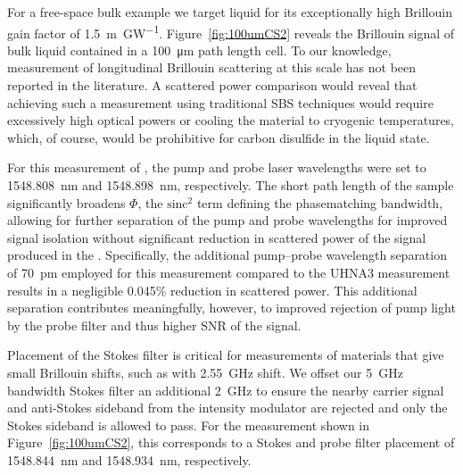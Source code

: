 For a free-space bulk example we target liquid  for its exceptionally high Brillouin gain factor of \SI{1.5}{\meter\per\giga\watt}.\cite{boyd2020nonlinear} Figure~\ref{fig:100umCS2} reveals the Brillouin signal of bulk  liquid contained in a \SI{100}{\micro\meter} path length cell. To our knowledge, measurement of longitudinal Brillouin scattering at this scale has not been reported in the literature. A scattered power comparison would reveal that achieving such a measurement using traditional \ac{SBS} techniques would require excessively high optical powers or cooling the material to cryogenic temperatures, which, of course, would be prohibitive for carbon disulfide in the liquid state.

For this measurement of , the pump and probe laser wavelengths were set to \SI{1548.808}{\nano\meter} and \SI{1548.898}{\nano\meter}, respectively. The short path length of the sample significantly broadens \(\Phi\), the \(\mathrm{sinc^2}\) term defining the phasematching bandwidth, allowing for further separation of the pump and probe wavelengths for improved signal isolation without significant reduction in scattered power of the signal produced in the . Specifically, the additional pump--probe wavelength separation of \SI{70}{\pico\meter} employed for this measurement compared to the UHNA3 measurement results in a negligible 0.045\% reduction in scattered power. This additional separation contributes meaningfully, however, to improved rejection of pump light by the probe filter and thus higher SNR of the signal.

Placement of the Stokes filter is critical for measurements of materials that give small Brillouin shifts, such as with  \SI{2.55}{\giga\hertz} shift. We offset our \SI{5}{\giga\hertz} bandwidth Stokes filter an additional \SI{2}{\giga\hertz} to ensure the nearby carrier signal and anti-Stokes sideband from the intensity modulator are rejected and only the Stokes sideband is allowed to pass. For the measurement shown in Figure~\ref{fig:100umCS2}, this corresponds to a Stokes and probe filter placement of \SI{1548.844}{\nano\meter} and \SI{1548.934}{\nano\meter}, respectively.

